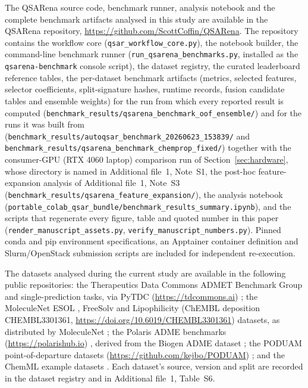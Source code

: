 The QSARena source code, benchmark runner, analysis notebook and the complete benchmark artifacts analysed in this study are available in the QSARena repository, \url{https://github.com/ScottCoffin/QSARena}. The repository contains the workflow core (\texttt{qsar\_workflow\_core.py}), the notebook builder, the command-line benchmark runner (\texttt{run\_qsarena\_benchmarks.py}, installed as the \texttt{qsarena-benchmark} console script), the dataset registry, the curated leaderboard reference tables, the per-dataset benchmark artifacts (metrics, selected features, selector coefficients, split-signature hashes, runtime records, fusion candidate tables and ensemble weights) for the run from which every reported result is computed (\texttt{benchmark\_results/qsarena\_benchmark\_oof\_ensemble/}) and for the runs it was built from (\texttt{benchmark\_results/autoqsar\_benchmark\_20260623\_153839/} and \texttt{benchmark\_results/qsarena\_benchmark\_chemprop\_fixed/}) together with the consumer-GPU (RTX 4060 laptop) comparison run of Section~\ref{sec:hardware}, whose directory is named in Additional file~1, Note~S1, the post-hoc feature-expansion analysis of Additional file~1, Note~S3 (\texttt{benchmark\_results/qsarena\_feature\_expansion/}), the analysis notebook (\texttt{portable\_colab\_qsar\_bundle/benchmark\_results\_summary.ipynb}), and the scripts that regenerate every figure, table and quoted number in this paper (\texttt{render\_manuscript\_assets.py}, \texttt{verify\_manuscript\_numbers.py}). Pinned conda and pip environment specifications, an Apptainer container definition and Slurm/OpenStack submission scripts are included for independent re-execution.

The datasets analysed during the current study are available in the following public repositories: the Therapeutics Data Commons ADMET Benchmark Group and single-prediction tasks, via PyTDC (\url{https://tdcommons.ai}) \cite{huang2021tdc}; the MoleculeNet ESOL \cite{delaney2004esol}, FreeSolv \cite{mobley2014freesolv} and Lipophilicity (ChEMBL deposition CHEMBL3301361, \url{https://doi.org/10.6019/CHEMBL3301361}) \cite{astrazeneca2015chembl} datasets, as distributed by MoleculeNet \cite{wu2018moleculenet}; the Polaris ADME benchmarks (\url{https://polarishub.io}) \cite{ash2025polaris,wognum2025polarissoftware}, derived from the Biogen ADME dataset \cite{fang2023adme}; the PODUAM point-of-departure datasets (\url{https://github.com/kejbo/PODUAM}) \cite{vonborries2026uncertainty}; and the ChemML example datasets \cite{haghighatlari2020chemml}. Each dataset's source, version and split are recorded in the dataset registry and in Additional file~1, Table~S6.

